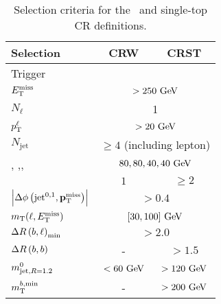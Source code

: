	\begin{table}[htpb]
	  \caption{Selection criteria for the \Wjets\ and single-top \ac{CR} definitions.} 
	  \begin{center}
	    \def\arraystretch{1.4}
	    \begin{tabular}{lcc}
	  	  \toprule
	     \textbf{Selection}                       &\textbf{CRW}                                             & \textbf{CRST}  \\ \toprule
	      Trigger                         & \multicolumn{2}{c}{\met}             \\ 
			$E_{\mathrm{T}}^{\mathrm{miss}}$                         & \multicolumn{2}{c}{$>250 \gev$}													\\ \midrule
	      $N_{\ell}$                      & \multicolumn{2}{c}{1}                                                           \\ 
	     	$p_{\mathrm{T}}^{\ell}$                     & \multicolumn{2}{c}{$>20 \gev$}      \\ \midrule
	     	$N_{\mathrm{jet}}$               & \multicolumn{2}{c}{$\ge 4$ (including lepton)}            \\
	      \ptzero, \ptone,\pttwo,\ptthree & \multicolumn{2}{c}{$80,80,40,40\gev$}                                          \\
	      \nBJet                          & $1$                                            & $ \ge 2 $ 							\\ \midrule
	      $\left|\Delta\phi\left(\mathrm{jet}^{0,1},\mathbf{p}_\mathrm{T}^\mathrm{miss}\right)\right|$                & \multicolumn{2}{c}{$>0.4$}                                                  \\ 
	      $m_{\mathrm{T}}(\ell,E_{\mathrm{T}}^{\mathrm{miss}})$                & \multicolumn{2}{c}{$[30,100]\gev$}                                          \\ 
	      $\Delta R\left(b,\ell\right)_{\mathrm{min}}$                     & \multicolumn{2}{c}{$>2.0$}                                                  \\ 
			$\Delta R\left(b,b\right)$                  & -                                               & $>1.5$                     \\ 
			$m^{0}_{\mathrm{jet,}R=1.2}$           & $<60\gev$                             & $>120\gev$                     \\ 
			$m_{\mathrm{T}}^{b,\mathrm{min}}$                      & -                          & $>200\gev$                     \\ 
	      \bottomrule
	    \end{tabular}
	  \end{center}
	  \label{tab:selectionCRWST}
	\end{table}

